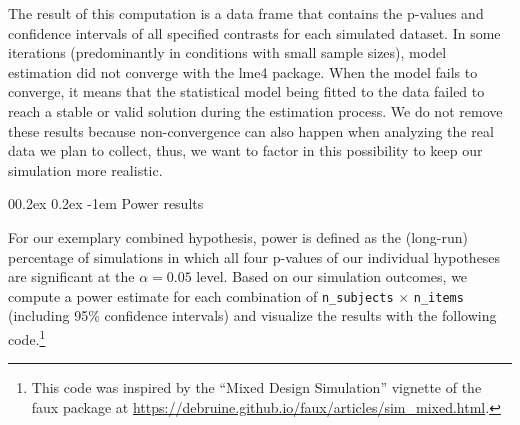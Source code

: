 \documentclass[
  man,floatsintext]{apa6}
\makeatletter
\let\oldparagraph\paragraph
\renewcommand{\paragraph}[1]{\oldparagraph{#1}\mbox{}}
\renewcommand{\paragraph}{\@startsection{paragraph}{4}{\parindent}%
  {0\baselineskip \@plus 0.2ex \@minus 0.2ex}%
  {-1em}%
  {\normalfont\normalsize\bfseries\itshape\typesectitle}}
\makeatother
\begin{document}
The result of this computation is a data frame that contains the p-values and confidence intervals of all specified contrasts for each simulated dataset.
In some iterations (predominantly in conditions with small sample sizes), model estimation did not converge with the lme4 package. When the model fails to converge, it means that the statistical model being fitted to the data failed to reach a stable or valid solution during the estimation process. We do not remove these results because non-convergence can also happen when analyzing the real data we plan to collect, thus, we want to factor in this possibility to keep our simulation more realistic.

\hypertarget{power-results}{%
\paragraph{Power results}\label{power-results}}

For our exemplary combined hypothesis, power is defined as the (long-run) percentage of simulations in which all four p-values of our individual hypotheses are significant at the \(\alpha = 0.05\) level. Based on our simulation outcomes, we compute a power estimate for each combination of \texttt{n\_subjects} \(\times\) \texttt{n\_items} (including 95\% confidence intervals) and visualize the results with the following code.\footnote{This code was inspired by the ``Mixed Design Simulation'' vignette of the faux package at \url{https://debruine.github.io/faux/articles/sim_mixed.html}.}
\end{document}
